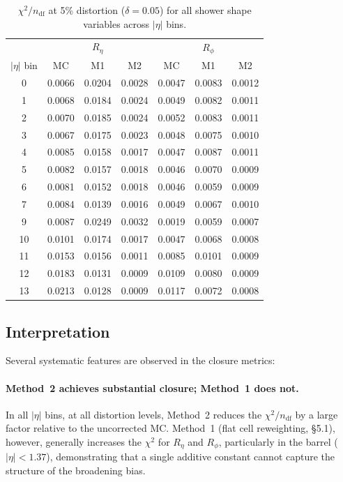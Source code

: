 \documentclass[12pt,a4paper]{article}
\begin{document}
\begin{table}[htbp]
\centering
\caption{%
  $\chi^2/n_\text{df}$ at 5\% distortion ($\delta=0.05$) for all shower shape
  variables across $|\eta|$ bins.
}
\label{tab:chi2_5pct}
\small
\begin{tabular}{
  c
  S S S
  S S S
}
\toprule
& 
&  \\
\cmidrule(lr){2-4}\cmidrule(lr){5-7}
{$|\eta|$ bin}
& {MC} & {M1} & {M2}
& {MC} & {M1} & {M2} \\
  & 0.0066 & 0.0204 & 0.0028 & 0.0047 & 0.0083 & 0.0012 \\
1  & 0.0068 & 0.0184 & 0.0024 & 0.0049 & 0.0082 & 0.0011 \\
2  & 0.0070 & 0.0185 & 0.0024 & 0.0052 & 0.0083 & 0.0011 \\
3  & 0.0067 & 0.0175 & 0.0023 & 0.0048 & 0.0075 & 0.0010 \\
4  & 0.0085 & 0.0158 & 0.0017 & 0.0047 & 0.0087 & 0.0011 \\
5  & 0.0082 & 0.0157 & 0.0018 & 0.0046 & 0.0070 & 0.0009 \\
6  & 0.0081 & 0.0152 & 0.0018 & 0.0046 & 0.0059 & 0.0009 \\
7  & 0.0084 & 0.0139 & 0.0016 & 0.0049 & 0.0067 & 0.0010 \\
9  & 0.0087 & 0.0249 & 0.0032 & 0.0019 & 0.0059 & 0.0007 \\
10 & 0.0101 & 0.0174 & 0.0017 & 0.0047 & 0.0068 & 0.0008 \\
11 & 0.0153 & 0.0156 & 0.0011 & 0.0085 & 0.0101 & 0.0009 \\
12 & 0.0183 & 0.0131 & 0.0009 & 0.0109 & 0.0080 & 0.0009 \\
13 & 0.0213 & 0.0128 & 0.0009 & 0.0117 & 0.0072 & 0.0008 \\
\bottomrule
\end{tabular}
\end{table}

\clearpage

\subsection{Interpretation}
\label{sec:results:interpretation}

Several systematic features are observed in the closure metrics:

\paragraph{Method~2 achieves substantial closure; Method~1 does not.}
In all $|\eta|$ bins, at all distortion levels, Method~2
reduces the $\chi^2/n_\text{df}$ by a large factor relative to the
uncorrected MC. Method~1 (flat cell reweighting, §5.1), however, generally increases the
$\chi^2$ for $R_\eta$ and $R_\phi$, particularly in the barrel
($|\eta|<1.37$), demonstrating that a single additive constant cannot
capture the structure of the broadening bias.
\end{document}
